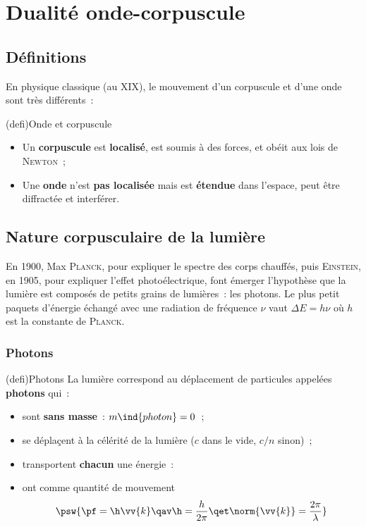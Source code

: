 \documentclass[../../main/main.tex]{subfiles}
\begin{document}
\section{Dualité onde-corpuscule}
\label{sec:dualondcorp}

\subsection{Définitions}
\label{ssec:docdef}
En physique classique (au \textsc{XIX}\ieme), le mouvement d'un corpuscule et
d'une onde sont très différents~:
\begin{tcb*}(defi){Onde et corpuscule}
	\begin{itemize}
		\item Un \textbf{corpuscule} est \textbf{localisé}, est soumis à des forces,
		      et obéit aux lois de \textsc{Newton}~;

		\item Une \textbf{onde} n'est \textbf{pas localisée} mais est
		      \textbf{étendue} dans l'espace, peut être diffractée et interférer.
	\end{itemize}
\end{tcb*}

\subsection{Nature corpusculaire de la lumière}
\label{ssec:lumcorp}
En 1900, Max \textsc{Planck}, pour expliquer le spectre des corps chauffés,
puis \textsc{Einstein}, en 1905, pour expliquer l'effet photoélectrique, font
émerger l'hypothèse que la lumière est composés de petits grains de lumières~:
les photons. Le plus petit paquets d'énergie échangé avec une radiation de
fréquence $\nu$ vaut $\Delta{E} = h\nu$ où $h$ est la constante de
\textsc{Planck}.

\subsubsection{Photons}
\label{sssec:photons}
\begin{tcb*}(defi){Photons}
	La lumière correspond au déplacement de particules appelées \textbf{photons}
	qui~:
	\begin{itemize}
		\item sont \textbf{sans masse}~: $m\ind{photon} = 0$~;
		\item se déplaçent à la célérité de la lumière ($c$ dans le vide, $c/n$
		      sinon)~;
		\item transportent \textbf{chacun} une énergie~:
		      \psw{%
			      \[
				      \Ec = h\nu = h \frac{c}{\lambda}
				      \qav
				      h = \SI{6.62606957e-34}{J.s}
			      \]
		      }%
		      \vspace{-15pt}
		\item ont comme quantité de mouvement
		      \[
			      \psw{%
				      \pf = \h \vv{k}
				      \qav
				      \h = \frac{h}{2\pi}
				      \qet
				      \norm{\vv{k}} = \frac{2\pi}{\lambda}
			      }%
		      \]
	\end{itemize}
\end{tcb*}
\end{document}
